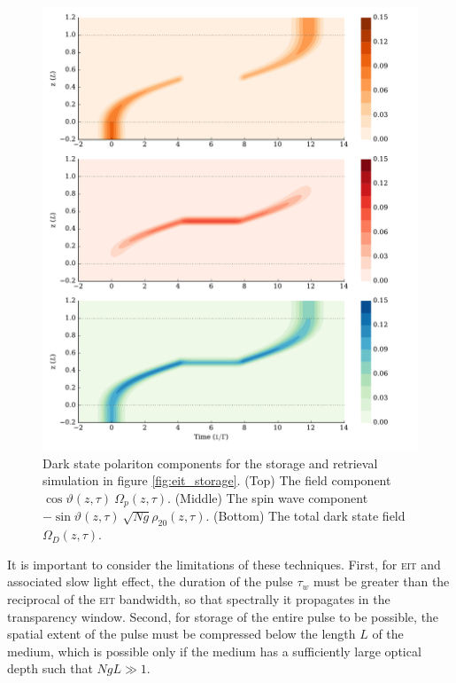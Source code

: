     \begin{figure}[]
      \includegraphics[width=\linewidth]
        {figs/04_polaritons/pls_p0_2pi_t1_Ng5e3_c10_gaussian_w0_5_storage_5_fig4.pdf}
      \caption{
      Dark state polariton components for the storage and retrieval simulation
      in figure \ref{fig:eit_storage}. (Top) The field component
      $\cos{\vartheta}(z, \tau)~\Omega_p(z, \tau)$. (Middle) The spin wave
      component $-\sin{\vartheta}(z, \tau) ~ \sqrt{Ng} \rho_{20}(z, \tau)$.
      (Bottom) The total dark state field $\Omega_D(z,\tau)$.
      }
      \label{fig:dark_state_components}
    \end{figure}



    It is important to consider the limitations of these techniques. First, for
    \textsc{eit} and associated slow light effect, the duration of the pulse
    $\tau_w$ must be greater than the reciprocal of the \textsc{eit} bandwidth,
    so that spectrally it propagates in the transparency   window. Second, for
    storage of the entire pulse to be possible, the spatial extent of the pulse
    must be compressed below the length $L$ of the medium, which is possible
    only if the medium has a sufficiently large optical depth such that $Ng L
    \gg 1$.\cite{Fleischhauer2005}

